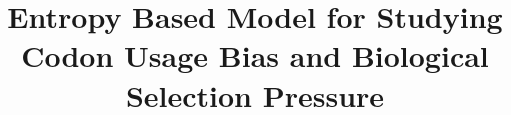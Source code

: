 \documentclass[conference]{IEEEtran}
\begin{document}
%
 

\title{Entropy Based Model for Studying Codon Usage Bias and Biological Selection Pressure}


\maketitle


% 


\end{document}
